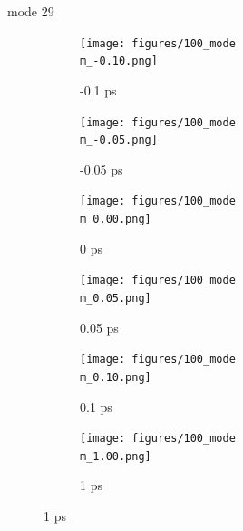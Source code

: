\documentclass{beamer}
\newcommand\w{0.32}
\begin{document}
\renewcommand\m{29}
\begin{frame}{mode \m}
	\begin{figure}
		\centering
		\begin{subfigure}[b]{\w\textwidth}
			\centering
			\texttt{[image: figures/100\_mode\\m\_-0.10.png]}
			\caption{-0.1 ps}
		\end{subfigure}
		\begin{subfigure}[b]{\w\textwidth}
			\centering
			\texttt{[image: figures/100\_mode\\m\_-0.05.png]}
			\caption{-0.05 ps}
		\end{subfigure}
		\begin{subfigure}[b]{\w\textwidth}
			\centering
			\texttt{[image: figures/100\_mode\\m\_0.00.png]}
			\caption{0 ps}
		\end{subfigure}
		\begin{subfigure}[b]{\w\textwidth}
			\centering
			\texttt{[image: figures/100\_mode\\m\_0.05.png]}
			\caption{0.05 ps}
		\end{subfigure}
		\begin{subfigure}[b]{\w\textwidth}
			\centering
			\texttt{[image: figures/100\_mode\\m\_0.10.png]}
			\caption{0.1 ps}
		\end{subfigure}
		\begin{subfigure}[b]{\w\textwidth}
			\centering
			\texttt{[image: figures/100\_mode\\m\_1.00.png]}
			\caption{1 ps}
		\end{subfigure}
	\end{figure}
\end{frame}
\end{document}
